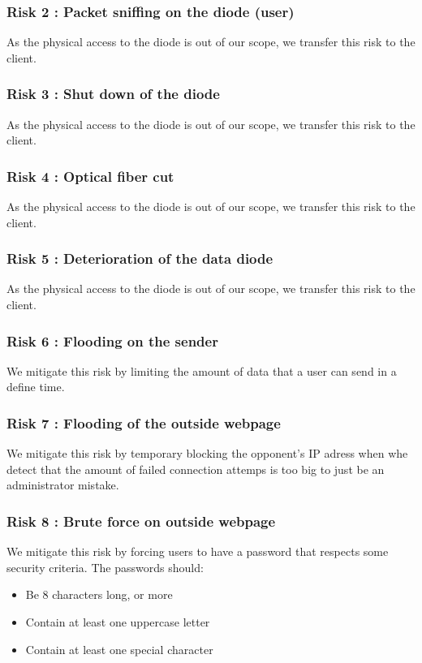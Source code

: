 \documentclass[a4paper,11pt]{article}
\begin{document}
\subsubsection{Risk 2 : Packet sniffing on the diode (user) }
As the physical access to the diode is out of our scope, we transfer this risk to the client.
\subsubsection{Risk 3 : Shut down of the diode}
As the physical access to the diode is out of our scope, we transfer this risk to the client.
\subsubsection{Risk 4 : Optical fiber cut}
As the physical access to the diode is out of our scope, we transfer this risk to the client.
\subsubsection{Risk 5 : Deterioration of the data diode}
As the physical access to the diode is out of our scope, we transfer this risk to the client.
\subsubsection{Risk 6 : Flooding on the sender}
We mitigate this risk by limiting the amount of data that a user can send in a define time.
\subsubsection{Risk 7 : Flooding of the outside webpage}
We mitigate this risk by temporary blocking the opponent's IP adress when whe detect that the amount of failed connection attemps is too big to just be an administrator mistake.
\subsubsection{Risk 8 : Brute force on outside webpage}
We mitigate this risk by forcing users to have a password that respects some security criteria. The passwords should:

\begin{itemize}
	\item{Be 8 characters long, or more}
	\item{Contain at least one uppercase letter}
	\item{Contain at least one special character}
\end{itemize}
\end{document}
